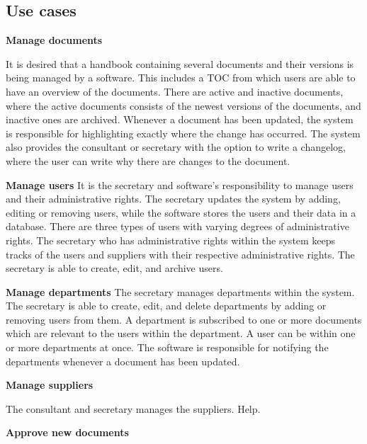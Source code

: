\subsection{Use cases}

\textbf{Manage documents}

It is desired that a handbook containing several documents and their versions is being managed by a software.
This includes a TOC from which users are able to have an overview of the documents.
There are active and inactive documents, where the active documents consists of the newest versions of the documents, and inactive ones are archived.
Whenever a document has been updated, the system is responsible for highlighting exactly where the change has occurred.
The system also provides the consultant or secretary with the option to write a changelog, where the user can write why there are changes to the document.

\textbf{Manage users}
It is the secretary and software's responsibility to manage users and their administrative rights.
The secretary updates the system by adding, editing or removing users, while the software stores the users and their data in a database.
There are three types of users with varying degrees of administrative rights.
The secretary who has administrative rights within the system keeps tracks of the users and suppliers with their respective administrative rights.
The secretary is able to create, edit, and archive users.

\textbf{Manage departments}
The secretary manages departments within the system.
The secretary is able to create, edit, and delete departments by adding or removing users from them.
A department is subscribed to one or more documents which are relevant to the users within the department.
A user can be within one or more departments at once.
The software is responsible for notifying the departments whenever a document has been updated.

\textbf{Manage suppliers}

The consultant and secretary manages the suppliers. Help.

\textbf{Approve new documents}

